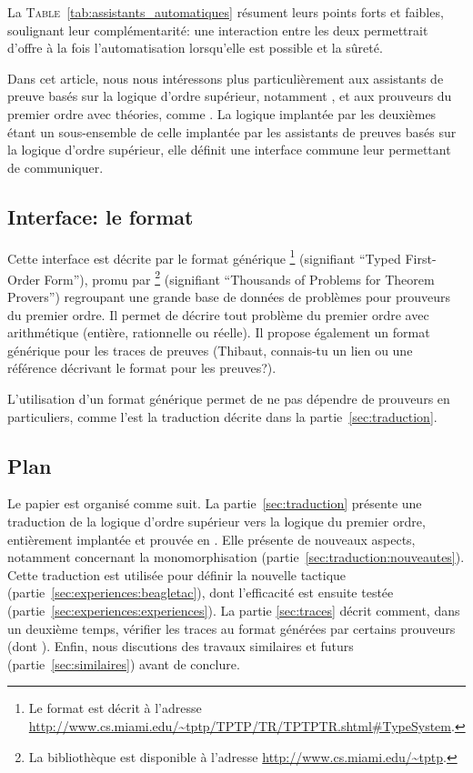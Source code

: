 La \textsc{Table}~\ref{tab:assistants_automatiques} résument leurs
points forts et faibles, soulignant leur complémentarité: une
interaction entre les deux permettrait d'offre à la fois
l'automatisation lorsqu'elle est possible et la sûreté.

Dans cet article, nous nous intéressons plus particulièrement aux
assistants de preuve basés sur la logique d'ordre supérieur, notamment
\holfour, et aux prouveurs du premier ordre avec théories, comme
\beagle. La logique implantée par les deuxièmes étant un sous-ensemble
de celle implantée par les assistants de preuves basés sur la logique
d'ordre supérieur, elle définit une interface commune leur permettant de
communiquer.


\subsection{Interface: le format \tff}

Cette interface est décrite par le format générique \tff\footnote{Le
  format \tff est décrit à l'adresse
  \url{http://www.cs.miami.edu/~tptp/TPTP/TR/TPTPTR.shtml\#TypeSystem}.}
(signifiant ``Typed First-Order Form''), promu par \tptp\footnote{La
  bibliothèque \tptp est disponible à l'adresse
  \url{http://www.cs.miami.edu/~tptp}.} (signifiant ``Thousands of
Problems for Theorem Provers'') regroupant une grande base de données de
problèmes pour prouveurs du premier ordre. Il permet de décrire tout
problème du premier ordre avec arithmétique (entière, rationnelle ou
réelle). Il propose également un format générique pour les traces de
preuves (\todo Thibaut, connais-tu un lien ou une référence décrivant le
format \tff pour les preuves?).

L'utilisation d'un format générique permet de ne pas dépendre de
prouveurs en particuliers, comme l'est la traduction décrite dans la
partie~\ref{sec:traduction}.


\subsection{Plan}

Le papier est organisé comme suit. La partie~\ref{sec:traduction}
présente une traduction de la logique d'ordre supérieur vers la logique
du premier ordre, entièrement implantée et prouvée en \holfour. Elle
présente de nouveaux aspects, notamment concernant la monomorphisation
(partie~\ref{sec:traduction:nouveautes}). Cette traduction est utilisée
pour définir la nouvelle tactique \beagletac
(partie~\ref{sec:experiences:beagletac}), dont l'efficacité est ensuite
testée (partie~\ref{sec:experiences:experiences}). La partie
\ref{sec:traces} décrit comment, dans un deuxième temps, vérifier les
traces au format \tff générées par certains prouveurs (dont \beagle).
Enfin, nous discutions des travaux similaires et futurs
(partie~\ref{sec:similaires}) avant de conclure.




